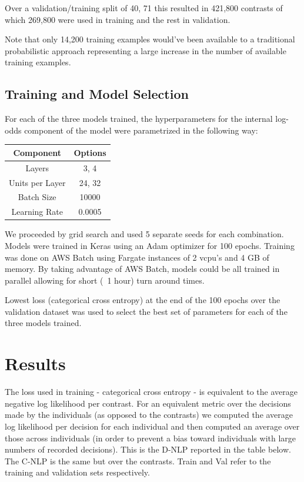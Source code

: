 \documentclass[11pt]{article}
\begin{document}
Over a validation/training split of 40, 71 this resulted in 421,800 contrasts of which 269,800 were used in training and the rest in validation. 

Note that only 14,200 training examples would've been available to a traditional probabilistic approach representing a large increase in the number of available training examples. 


\subsection*{Training and Model Selection}

For each of the three models trained, the hyperparameters for the internal log-odds component of the model were parametrized in the following way:

\begin{center}
\begin{tabular}{| c | c |} 
\hline 
Component & Options \\
\hline
Layers & 3, 4 \\ 
Units per Layer & 24, 32 \\
Batch Size & 10000 \\
Learning Rate & 0.0005 \\
\hline
\end{tabular}
\end{center}

We proceeded by grid search and used 5 separate seeds for each combination. Models were trained in Keras using an Adam optimizer for 100 epochs. Training was done on AWS Batch using Fargate instances of 2 vcpu's and 4 GB of memory. By taking advantage of AWS Batch,  models could be all trained in parallel allowing for short (~1 hour) turn around times. 

Lowest loss (categorical cross entropy) at the end of the 100 epochs over the validation dataset was used to select the best set of parameters for each of the three models trained.


\section*{Results}

The loss used in training - categorical cross entropy - is equivalent to the average negative log likelihood per contrast. For an equivalent metric over the decisions made by the individuals (as opposed to the contrasts) we computed the average log likelihood per decision for each individual and then computed an average over those across individuals (in order to prevent a bias toward individuals with large numbers of recorded decisions). This is the D-NLP reported in the table below. The C-NLP is the same but over the contrasts. Train and Val refer to the training and validation sets respectively.
\end{document}
